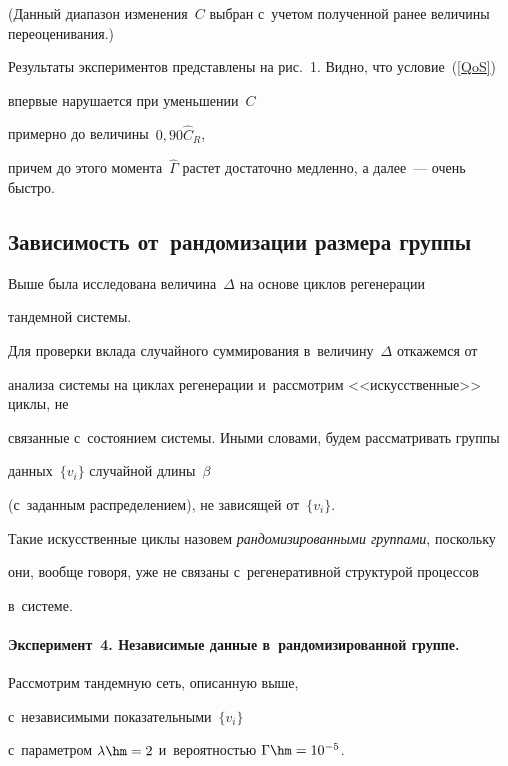 (Данный диапазон изменения~$C$ выбран с~учетом полученной ранее величины  переоценивания.)


Результаты экспериментов пред\-став\-ле\-ны на рис.~1. Видно,  что условие~(\ref{QoS}) 


впервые нарушается при уменьшении~$C$


примерно до величины~$0{,}90\hat C_R$,


причем до этого момента~$\hat{\Gamma}$  растет достаточно медленно, а далее~---  очень  быстро.





\subsection{Зависимость  {\boldmath{$\Delta$}} от~рандомизации размера группы}





Выше была  исследована  величина~$\Delta$  на основе   циклов  регенерации 


тандемной системы.


Для проверки вклада случайного суммирования в~величину~$\Delta$  откажемся от 


анализа системы на циклах регенерации и~рассмотрим <<искусственные>> циклы, не 


связанные с~состоянием системы. Иными словами, будем рас\-смат\-ри\-вать группы 


данных~$\{v_i\}$  случайной  длины~$\beta$ 


(с~заданным распределением), не зависящей от~$\{v_i\}$.


Такие искусственные циклы назовем  {\it рандомизированными группами}, поскольку 


они, вообще говоря,  уже не связаны с~регенеративной структурой процессов 


в~системе.





\paragraph*{Эксперимент~4. Независимые данные в~рандомизированной группе.}


Рассмотрим тандемную сеть, описанную  выше,


с~независимыми  показательными~$\{v_i\}$


с~параметром $\lambda\hm=2$ и~вероятностью  $\Gamma\hm=10^{-5}$.


